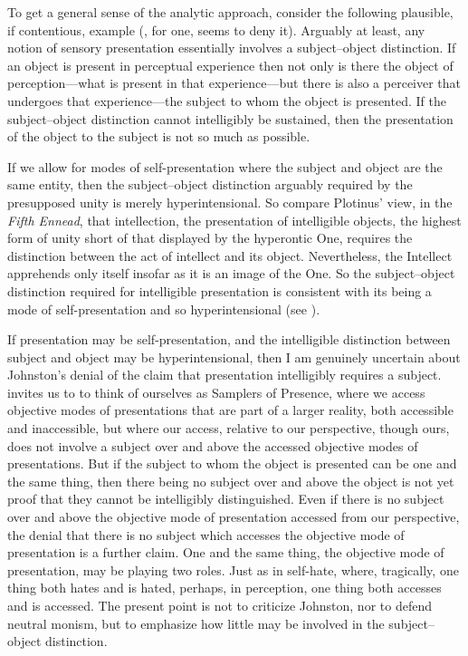To get a general sense of the analytic approach, consider the following plausible, if contentious, example (\citealt{Johnston:2007qy}, for one, seems to deny it). Arguably at least, any notion of sensory presentation essentially involves a subject--object distinction. If an object is present in perceptual experience then not only is there the object of perception---what is present in that experience---but there is also a perceiver that undergoes that experience---the subject to whom the object is presented. If the subject--object distinction cannot intelligibly be sustained, then the presentation of the object to the subject is not so much as possible.

If we allow for modes of self-presentation where the subject and object are the same entity, then the subject--object distinction arguably required by the presupposed unity is merely hyperintensional. So compare Plotinus' view, in the \emph{Fifth Ennead}, that intellection, the presentation of intelligible objects, the highest form of unity short of that displayed by the hyperontic One, requires the distinction between the act of intellect and its object. Nevertheless, the Intellect apprehends only itself insofar as it is an image of the One. So the subject--object distinction required for intelligible presentation is consistent with its being a mode of self-presentation and so hyperintensional (see \citealt[chapter 3.1]{Gerson:1994aa}). 

If presentation may be self-presentation, and the intelligible distinction between subject and object may be hyperintensional, then I am genuinely uncertain about Johnston's denial of the claim that presentation intelligibly requires a subject. \citet{Johnston:2007qy} invites us to to think of ourselves as Samplers of Presence, where we access objective modes of presentations that are part of a larger reality, both accessible and inaccessible, but where our access, relative to our perspective, though ours, does not involve a subject over and above the accessed objective modes of presentations. But if the subject to whom the object is presented can be one and the same thing, then there being no subject over and above the object is not yet proof that they cannot be intelligibly distinguished. Even if there is no subject over and above the objective mode of presentation accessed from our perspective, the denial that there is no subject which accesses the objective mode of presentation is a further claim. One and the same thing, the objective mode of presentation, may be playing two roles. Just as in self-hate, where, tragically, one thing both hates and is hated, perhaps, in perception, one thing both accesses and is accessed. The present point is not to criticize Johnston, nor to defend neutral monism, but to emphasize how little may be involved in the subject--object distinction.

